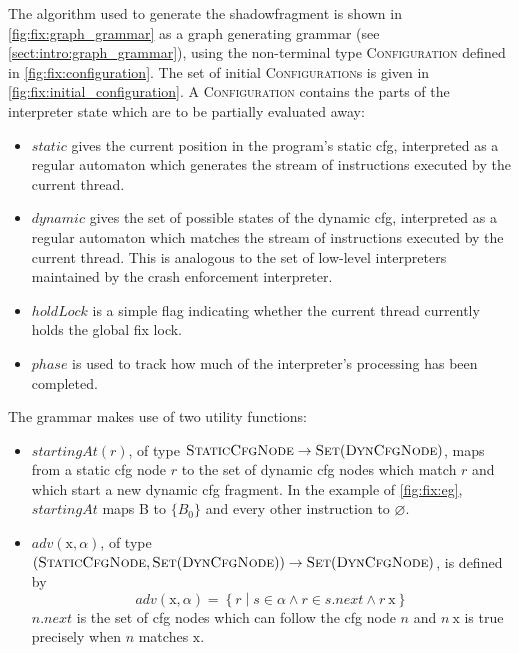 \noindent
The algorithm used to generate the \gls{shadowfragment} is shown in
\autoref{fig:fix:graph_grammar} as a graph generating grammar (see
\autoref{sect:intro:graph_grammar}), using the non-terminal type
\textsc{Configuration} defined in \autoref{fig:fix:configuration}.
The set of initial \textsc{Configuration}s is given in
\autoref{fig:fix:initial_configuration}.  A \textsc{Configuration}
contains the parts of the interpreter state which are to be partially
evaluated away:
\begin{itemize}
\item $\mathit{static}$ gives the current position in the program's
  static \gls{cfg}, interpreted as a regular automaton which generates
  the stream of instructions executed by the current thread.
\item $\mathit{dynamic}$ gives the set of possible states of the dynamic
  \gls{cfg}, interpreted as a regular automaton which matches the
  stream of instructions executed by the current thread.  This is
  analogous to the set of low-level interpreters maintained by the
  crash enforcement interpreter.
\item $\mathit{holdLock}$ is a simple flag indicating whether the
  current thread currently holds the global fix lock.
\item $\mathit{phase}$ is used to track how much of the interpreter's
  processing has been completed.
\end{itemize}
The grammar makes use of two utility functions:
\begin{itemize}
\item $\mathit{startingAt}(r)$, of type $\textsc{StaticCfgNode}
  \rightarrow \textsc{Set}(\textsc{DynCfgNode})$, maps from a static
  \gls{cfg} node $r$ to the set of dynamic \gls{cfg} nodes which match
  $r$ and which start a new dynamic \gls{cfg} fragment.  In the
  example of \autoref{fig:fix:eg}, $\mathit{startingAt}$ maps B to
  $\{B_0\}$ and every other instruction to $\varnothing$.
\item $\mathit{adv}(\mathrm{x}, \alpha)$, of type
  $(\textsc{StaticCfgNode}, \textsc{Set}(\textsc{DynCfgNode}))
  \rightarrow \textsc{Set}(\textsc{DynCfgNode})$, is defined by
  \begin{displaymath}
    \mathit{adv}(\mathrm{x}, \alpha) = \left\{r \middle| s \in \alpha \wedge r \in s.\mathit{next} \wedge r ~ \mathrm{x}\right\}
  \end{displaymath}
  $n.\mathit{next}$ is the set of \gls{cfg} nodes which can follow the
  \gls{cfg} node $n$ and $n ~ \mathrm{x}$ is true precisely when $n$
  matches $\mathrm{x}$.
\end{itemize}
